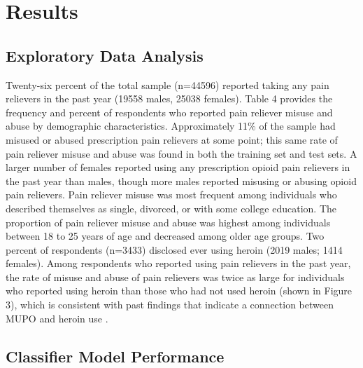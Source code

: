 \documentclass[sigconf]{acmart}
\begin{document}
 
\section{Results}

\subsection{Exploratory Data Analysis}

Twenty-six percent of the total sample (n=44596) reported taking any pain 
relievers in the past year (19558 males, 25038 females). 
Table 4 provides the frequency and percent of respondents who reported 
pain reliever misuse and abuse by demographic characteristics. 
Approximately 11\% of the sample had misused or abused prescription pain 
relievers at some point; this same rate of pain reliever misuse and abuse 
was found in both the training set and test sets. A larger number of females 
reported using any prescription opioid pain relievers in the past year than 
males, though more males reported misusing or abusing opioid pain relievers. 
Pain reliever misuse was most frequent among individuals who described 
themselves as single, divorced, or with some college education. The 
proportion of pain reliever misuse and abuse was highest among individuals 
between 18 to 25 years of age and decreased among older age groups. Two 
percent of respondents (n=3433) disclosed ever using heroin (2019 males; 
1414 females). Among respondents who reported using pain relievers in the 
past year, the rate of misuse and abuse of pain relievers was twice as 
large for individuals who reported using heroin than those who had not 
used heroin (shown in Figure 3), which is consistent with past findings 
that indicate a connection between MUPO and heroin use 
\cite{muhuri13, unick13}.


\subsection{Classifier Model Performance}
\end{document}
